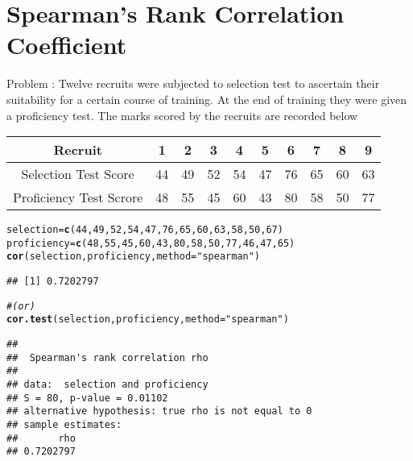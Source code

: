 \documentclass{article}\usepackage[]{graphicx}\usepackage[]{xcolor}
\makeatletter
\newcommand{\hlnum}[1]{\textcolor[rgb]{0.686,0.059,0.569}{#1}}%
\newcommand{\hlsng}[1]{\textcolor[rgb]{0.192,0.494,0.8}{#1}}%
\newcommand{\hlcom}[1]{\textcolor[rgb]{0.678,0.584,0.686}{\textit{#1}}}%
\newcommand{\hldef}[1]{\textcolor[rgb]{0.345,0.345,0.345}{#1}}%
\newcommand{\hlkwb}[1]{\textcolor[rgb]{0.69,0.353,0.396}{#1}}%
\newcommand{\hlkwc}[1]{\textcolor[rgb]{0.333,0.667,0.333}{#1}}%
\newcommand{\hlkwd}[1]{\textcolor[rgb]{0.737,0.353,0.396}{\textbf{#1}}}%
\newenvironment{kframe}{%
 \def\at@end@of@kframe{}%
 \ifinner\ifhmode%
  \def\at@end@of@kframe{\end{minipage}}%
  \begin{minipage}{\columnwidth}%
 \fi\fi%
 \def\FrameCommand##1{\hskip\@totalleftmargin \hskip-\fboxsep
 \colorbox{shadecolor}{##1}\hskip-\fboxsep
     \hskip-\linewidth \hskip-\@totalleftmargin \hskip\columnwidth}%
 \MakeFramed {\advance\hsize-\width
   \@totalleftmargin\z@ \linewidth\hsize
   \@setminipage}}%
 {\par\unskip\endMakeFramed%
 \at@end@of@kframe}
\newenvironment{knitrout}{}{} %
\makeatother
\begin{document}
\section{Spearman's Rank Correlation Coefficient}
Problem : \newline 
Twelve recruits were subjected to selection test to ascertain their
suitability for a certain course of training. At the end of training they were given a
proficiency test. The marks scored by the recruits are recorded below
\begin{table}[!ht]
    \centering
    \begin{tabular}{|c|c|c|c|c|c|c|c|c|c|}
    \hline
        Recruit & 1 & 2 & 3 & 4 & 5 & 6 & 7 & 8 & 9 \\ \hline
        Selection Test Score & 44 & 49 & 52 & 54 & 47 & 76 & 65 & 60 & 63 \\ \hline
        Proficiency Test Scrore & 48 & 55 & 45 & 60 & 43 & 80 & 58 & 50 & 77 \\ \hline
       
    \end{tabular}
\end{table}
\begin{knitrout}
\color{fgcolor}\begin{kframe}
\begin{alltt}
\hldef{selection} \hlkwb{=}\hlkwd{c}\hldef{(}\hlnum{44}\hldef{,}\hlnum{49}\hldef{,}\hlnum{52}\hldef{,}\hlnum{54}\hldef{,}\hlnum{47}\hldef{,}\hlnum{76}\hldef{,}\hlnum{65}\hldef{,}\hlnum{60}\hldef{,}\hlnum{63}\hldef{,}\hlnum{58}\hldef{,}\hlnum{50}\hldef{,}\hlnum{67}\hldef{)}
\hldef{proficiency} \hlkwb{=}\hlkwd{c}\hldef{(}\hlnum{48}\hldef{,}\hlnum{55}\hldef{,}\hlnum{45}\hldef{,}\hlnum{60}\hldef{,}\hlnum{43}\hldef{,}\hlnum{80}\hldef{,}\hlnum{58}\hldef{,}\hlnum{50}\hldef{,}\hlnum{77}\hldef{,}\hlnum{46}\hldef{,}\hlnum{47}\hldef{,}\hlnum{65}\hldef{)}
\hlkwd{cor}\hldef{(selection,proficiency,}\hlkwc{method} \hldef{=}\hlsng{"spearman"}\hldef{)}
\end{alltt}
\begin{verbatim}
## [1] 0.7202797
\end{verbatim}
\begin{alltt}
\hlcom{# (or)}
\hlkwd{cor.test}\hldef{(selection,proficiency,}\hlkwc{method} \hldef{=}\hlsng{"spearman"}\hldef{)}
\end{alltt}
\begin{verbatim}
## 
## 	Spearman's rank correlation rho
## 
## data:  selection and proficiency
## S = 80, p-value = 0.01102
## alternative hypothesis: true rho is not equal to 0
## sample estimates:
##       rho 
## 0.7202797
\end{verbatim}
\end{kframe}
\end{knitrout}
\end{document}
